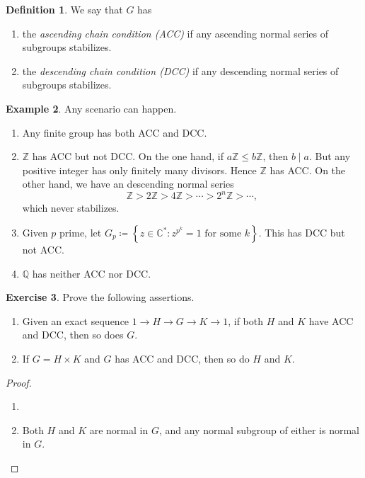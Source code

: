 \documentclass[10pt,letterpaper,cm]{nupset}
\theoremstyle{definition}
\newtheorem{definition}{Definition}[subsection]
\newtheorem{exmp}[definition]{Example}
\theoremstyle{theorem}
\newtheorem{exercise}[definition]{Exercise}
\theoremstyle{remark}
\newcommand{\C}{\mathbb C}
\newcommand{\Q}{\mathbb Q}
\newcommand{\Z}{\mathbb Z}
\newcommand{\1}{\mathbf{1}}
\newcommand{\0}{\vec 0}
\newcommand{\dcc}{\textsf{DCC}\xspace}
\newcommand{\acc}{\textsf{ACC}\xspace}
\begin{document}
\begin{definition}\label{ACC} We say that $G$ has 
\begin{enumerate}
\item the \textit{ascending chain condition (\acc)} if any ascending normal series of subgroups stabilizes.
\item the \textit{descending chain condition (\dcc)} if any descending normal series of subgroups stabilizes.
\end{enumerate}
\end{definition}

\begin{exmp} Any scenario can happen.
\begin{enumerate}
\item Any finite group has both \acc and \dcc.
\item $\Z$ has \acc but not \dcc. On the one hand, if $a\Z \leq b\Z$, then $b\mid a$. But any positive integer has only finitely many divisors. Hence $\Z$ has \acc. On the other hand, we have an descending normal series
\[
\Z > 2\Z > 4\Z >\cdots >2^n\Z> \cdots
,\] which never stabilizes. 
\item Given $p$ prime, let $G_p \coloneqq  \left\{z\in \C^{\ast} : z^{p^k} =1 \text{ for some } k \right\}$. This has \dcc but not \acc.  
\item $\Q$ has neither \acc nor \dcc.
\end{enumerate}
\end{exmp}

\begin{exercise} Prove the following assertions.
\begin{enumerate}
\item Given an exact sequence $1 \to H \to G \to K \to 1$, if both $H$ and $K$ have \acc and \dcc, then so does $G$. 
\item If $G = H \times K$ and $G$ has \acc and \dcc, then so do $H$ and $K$.
\end{enumerate}
\begin{proof} $ $ 
\begin{enumerate}
\item 
\item Both $H$ and $K$ are normal in $G$, and any normal subgroup of either is normal in $G$.
\end{enumerate}
\end{proof}
\end{exercise}
\end{document}

